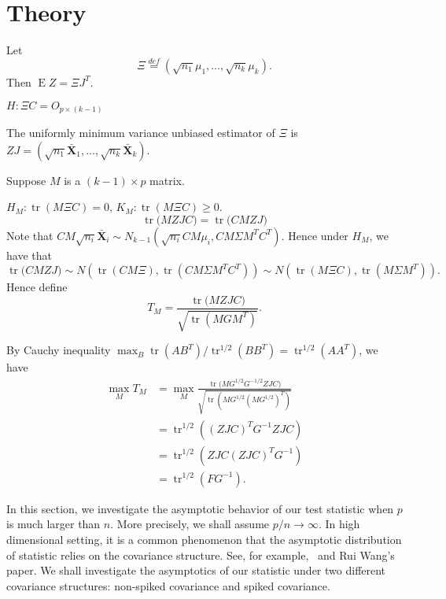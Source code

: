 \documentclass[review]{elsarticle}
\DeclareMathOperator{\mytr}{tr}
\DeclareMathOperator{\myE}{E}
\newcommand{\bX}{\mathbf{X}}
\theoremstyle{plain}
\theoremstyle{definition}
\theoremstyle{remark}
\begin{document}
   
   
   










\section{Theory}
Let
$$
\Xi\overset{def}{=}(\sqrt{n_1}\mu_1,\ldots,\sqrt{n_k}\mu_k).
$$
Then $\myE Z=\Xi J^T$.

$H: \Xi C=O_{p\times (k-1)}$

The uniformly minimum variance unbiased estimator of $\Xi$ is $ZJ=(\sqrt{n_1}\bar{\bX}_1,\ldots,\sqrt{n_k}\bar{\bX}_k)$.

Suppose $M$ is a $(k-1)\times p$ matrix.

$H_{M}: \mytr (M \Xi C)=0$, $K_{M}: \mytr (M \Xi C)\geq 0$.
$$
\mytr \big(MZJC\big)
=
\mytr \big(CMZJ\big)
$$
Note that $CM\sqrt{n_i}\bar{\bX}_i\sim N_{k-1}(\sqrt{n_i}CM\mu_i,CM\Sigma M^T C^T)$.
Hence under $H_M$, we have that
$$
\mytr \big(CMZJ\big)
\sim
N(\mytr(CM\Xi),\mytr(CM\Sigma M^T C^T))
\sim
N(\mytr(M\Xi C),\mytr(M\Sigma M^T )).
$$
Hence define
$$
T_M = \frac{
\mytr \big(MZJC\big)
}{
    \sqrt{\mytr(M G M^T)}
}.
$$


By Cauchy inequality $\max_B \mytr(AB^T)/\mytr^{1/2}(BB^T)=\mytr^{1/2}(AA^T)$, we have
$$
\begin{aligned}
    \max_M T_M &=\max_M \frac{\mytr \big(MG^{1/2}G^{-1/2}ZJC\big)
}{\sqrt{\mytr(M G^{1/2} (M G^{1/2})^T)}
}\\
    &=\mytr^{1/2}((ZJC)^T G^{-1}ZJC)\\
    &=\mytr^{1/2}( ZJC(ZJC)^T G^{-1})\\
    &=\mytr^{1/2}(F G^{-1}).
\end{aligned}
$$

In this section, we investigate the asymptotic behavior of our test statistic when $p$ is much larger than $n$.
More precisely, we shall assume $p/n\to\infty$.
In high dimensional setting, it is a common phenomenon that the asymptotic distribution of statistic relies on the covariance structure.
See, for example,~\cite{Ma2015A} and Rui Wang's paper.
We shall investigate the asymptotics of our statistic under two different covariance structures: non-spiked covariance and spiked covariance.
\end{document}
